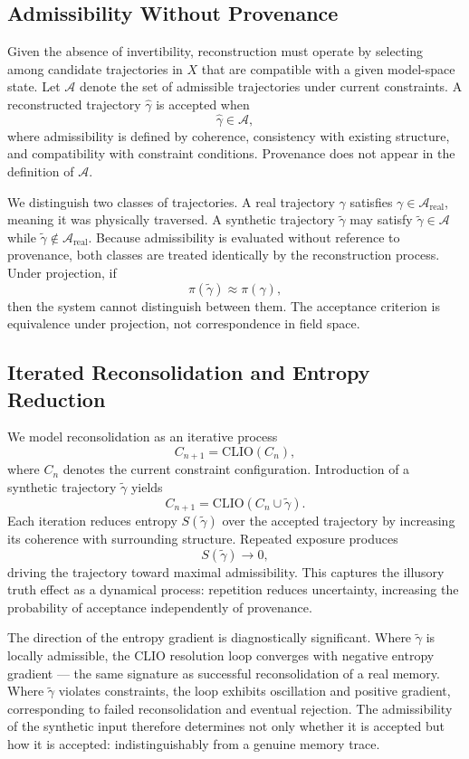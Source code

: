\documentclass[12pt, a4paper]{article}
\begin{document}
\subsection{Admissibility Without Provenance}

Given the absence of invertibility, reconstruction must operate by selecting among candidate trajectories in $X$ that are compatible with a given model-space state. Let $\mathcal{A}$ denote the set of admissible trajectories under current constraints. A reconstructed trajectory $\hat{\gamma}$ is accepted when
\[
\hat{\gamma} \in \mathcal{A},
\]
where admissibility is defined by coherence, consistency with existing structure, and compatibility with constraint conditions. Provenance does not appear in the definition of $\mathcal{A}$.

We distinguish two classes of trajectories. A real trajectory $\gamma$ satisfies $\gamma \in \mathcal{A}_{\mathrm{real}}$, meaning it was physically traversed. A synthetic trajectory $\tilde{\gamma}$ may satisfy $\tilde{\gamma} \in \mathcal{A}$ while $\tilde{\gamma} \notin \mathcal{A}_{\mathrm{real}}$. Because admissibility is evaluated without reference to provenance, both classes are treated identically by the reconstruction process. Under projection, if
\[
\pi(\tilde{\gamma}) \approx \pi(\gamma),
\]
then the system cannot distinguish between them. The acceptance criterion is equivalence under projection, not correspondence in field space.

\subsection{Iterated Reconsolidation and Entropy Reduction}

We model reconsolidation as an iterative process
\[
C_{n+1} = \mathrm{CLIO}(C_n),
\]
where $C_n$ denotes the current constraint configuration. Introduction of a synthetic trajectory $\tilde{\gamma}$ yields
\[
C_{n+1} = \mathrm{CLIO}(C_n \cup \tilde{\gamma}).
\]
Each iteration reduces entropy $S(\tilde{\gamma})$ over the accepted trajectory by increasing its coherence with surrounding structure. Repeated exposure produces
\[
S(\tilde{\gamma}) \rightarrow 0,
\]
driving the trajectory toward maximal admissibility. This captures the illusory truth effect as a dynamical process: repetition reduces uncertainty, increasing the probability of acceptance independently of provenance.

The direction of the entropy gradient is diagnostically significant. Where $\tilde{\gamma}$ is locally admissible, the CLIO resolution loop converges with negative entropy gradient --- the same signature as successful reconsolidation of a real memory. Where $\tilde{\gamma}$ violates constraints, the loop exhibits oscillation and positive gradient, corresponding to failed reconsolidation and eventual rejection. The admissibility of the synthetic input therefore determines not only whether it is accepted but how it is accepted: indistinguishably from a genuine memory trace.
\end{document}
